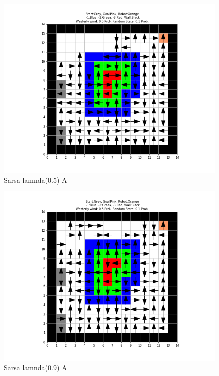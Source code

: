 \documentclass[12pt, letterpaper, twoside]{report}
\begin{document}
  \centering
  \begin{figure}[b]
    \includegraphics[width=\linewidth]{Sarsa_Problem_A_lambda_05.png}
    \caption{Sarsa lamnda(0.5) A}
  \end{figure}
  \newpage
  \centering
  \begin{figure}[b]
    \includegraphics[width=\linewidth]{Sarsa_Problem_A_lambda_09.png}
    \caption{Sarsa lamnda(0.9) A}
  \end{figure}
\end{document}
